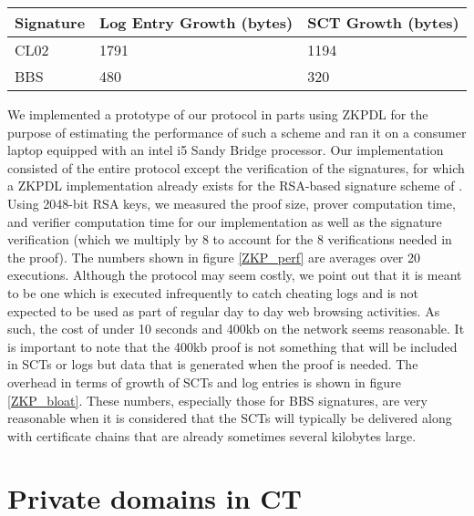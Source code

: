 \documentclass[letterpaper,twocolumn,10pt]{article}
\begin{document}
\begin{center}
\begin{figure*}
    \begin{tabular}{ | l | l | l |}
    \hline
    Signature & Log Entry Growth (bytes) & SCT Growth (bytes) \\ \hline
    CL02\cite{CL02} & 1791 & 1194 \\ \hline
    BBS\cite{BBS04} & 480 & 320 \\ 
    \hline
    \end{tabular}
    \caption{Expected growth in log entry and SCT size due to inclusion of signatures required for our scheme when using CL02 signatures or BBS signatures. Log entries require including 3 signatures, and SCTs require 2.}
\label{ZKP_bloat}
\end{figure*}
\end{center}
We implemented a prototype of our protocol in parts using ZKPDL \cite{ZKPDL} for the purpose of estimating the performance of such a scheme and ran it on a consumer laptop equipped with an intel i5 Sandy Bridge processor. Our implementation consisted of the entire protocol except the verification of the signatures, for which a ZKPDL implementation already exists for the RSA-based signature scheme of \cite{CL02}. Using 2048-bit RSA keys, we measured the proof size, prover computation time, and verifier computation time for our implementation as well as the signature verification (which we multiply by 8 to account for the 8 verifications needed in the proof). The numbers shown in figure \ref{ZKP_perf} are averages over 20 executions. Although the protocol may seem costly, we point out that it is meant to be one which is executed infrequently to catch cheating logs and is not expected to be used as part of regular day to day web browsing activities. As such, the cost of under 10 seconds and 400kb on the network seems reasonable. It is important to note that the 400kb proof is not something that will be included in SCTs or logs but data that is generated when the proof is needed. The overhead in terms of growth of SCTs and log entries is shown in figure \ref{ZKP_bloat}. These numbers, especially those for BBS signatures, are very reasonable when it is considered that the SCTs will typically be delivered along with certificate chains that are already sometimes several kilobytes large. 

\section{Private domains in CT}
\end{document}
